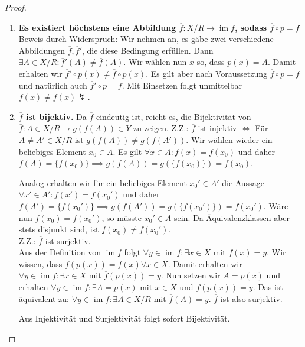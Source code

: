 \documentclass{article}
\begin{document}
\begin{enumerate}[a)]
\begin{proof}
\begin{enumerate}[1)]
				\item \textbf{Es existiert höchstens eine Abbildung $\overline{f}: X/R\to \operatorname{im} f$, sodass $\overline{f} \circ p = f$}\\
				Beweis durch Widerspruch: Wir nehmen an, es gäbe zwei verschiedene Abbildungen $\overline{f}, \overline{f}'$, die diese Bedingung erfüllen.
				Dann $\exists A \in X/R: \overline{f}'(A) \neq \overline{f}(A)$. Wir wählen nun $x$ so, dass $p(x) = A$. Damit erhalten wir $\overline{f}'\circ p(x) \neq \overline{f}\circ p(x)$. Es gilt aber nach Voraussetzung $\overline{f} \circ p = f$ und natürlich auch $\overline{f}' \circ p = f$.
				Mit Einsetzen folgt unmittelbar $f(x) \neq f(x) \lightning$.
				
				\item \textbf{$\overline{f}$ ist bijektiv.}
				Da $\overline{f}$ eindeutig ist, reicht es, die Bijektivität von $\overline{f}: A\in X/R\mapsto g(f(A)) \in Y$ zu zeigen.
				Z.Z.: $\overline{f}$ ist injektiv $\Leftrightarrow$ Für $A \neq A' \in X/R$ ist $g(f(A)) \neq g(f(A'))$.
				Wir wählen wieder ein beliebiges Element $x_0\in A$. Es gilt $\forall x\in A: f(x) = f(x_0)$ und daher $f(A) = \{f(x_0)\} \implies g(f(A)) = g(\{f(x_0)\}) = f(x_0)$.
				
				Analog erhalten wir für ein beliebiges Element $x_0'\in A'$ die Aussage $\forall x'\in A': f(x') = f(x_0') $ und daher $f(A') = \{f(x_0')\} \implies g(f(A')) = g(\{f(x_0')\}) = f(x_0')$. Wäre nun $f(x_0) = f(x_0')$, so müsste $x_0' \in A$ sein. Da Äquivalenzklassen aber stets disjunkt sind, ist $f(x_0) \neq f(x_0')$.\\
				Z.Z.: $\overline{f}$ ist surjektiv.\\
				Aus der Definition von $\operatorname{im} f$ folgt $\forall y \in \operatorname{im} f: \exists x \in X$ mit $f(x) = y$. Wir wissen, dass $\overline{f}(p(x)) = f(x) \forall x\in X$. Damit erhalten wir $\forall y \in \operatorname{im} f:\exists x \in X$ mit $\overline{f}(p(x)) = y$.
				Nun setzen wir $A = p(x)$ und erhalten $\forall y \in \operatorname{im} f:\exists A = p(x)$ mit $x \in X$ und $\overline{f}(p(x)) = y$.
				Das ist äquivalent zu: $\forall y \in \operatorname{im} f:\exists A \in X/R$ mit $\overline{f}(A) = y$. $\overline{f}$ ist also surjektiv.
				
				Aus Injektivität und Surjektivität folgt sofort Bijektivität.
			\end{enumerate}
		\end{proof}
	\end{enumerate} 
\end{document}
